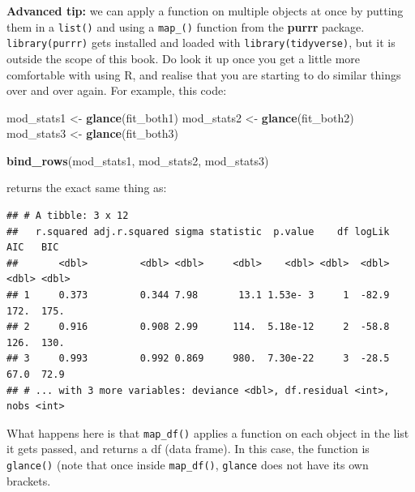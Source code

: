 \documentclass[
  12pt,
  krantz2]{krantz}
\makeatletter
\newenvironment{Shaded}{\begin{snugshade}}{\end{snugshade}}
\newcommand{\KeywordTok}[1]{\textcolor[rgb]{0.13,0.29,0.53}{\textbf{#1}}}
\newcommand{\NormalTok}[1]{#1}
\newcommand{\OperatorTok}[1]{\textcolor[rgb]{0.81,0.36,0.00}{\textbf{#1}}}
\newcommand{\StringTok}[1]{\textcolor[rgb]{0.31,0.60,0.02}{#1}}
\newenvironment{kframe}{%
\medskip{}
\setlength{\fboxsep}{.8em}
 \def\at@end@of@kframe{}%
 \ifinner\ifhmode%
  \def\at@end@of@kframe{\end{minipage}}%
  \begin{minipage}{\columnwidth}%
 \fi\fi%
 \def\FrameCommand##1{\hskip\@totalleftmargin \hskip-\fboxsep
 \colorbox{shadecolor}{##1}\hskip-\fboxsep
     \hskip-\linewidth \hskip-\@totalleftmargin \hskip\columnwidth}%
 \MakeFramed {\advance\hsize-\width
   \@totalleftmargin\z@ \linewidth\hsize
   \@setminipage}}%
 {\par\unskip\endMakeFramed%
 \at@end@of@kframe}
\renewenvironment{Shaded}{\begin{kframe}}{\end{kframe}}
\makeatother
\begin{document}
\textbf{Advanced tip:} we can apply a function on multiple objects at once by putting them in a \texttt{list()} and using a \texttt{map\_()} function from the \textbf{purrr} package. \texttt{library(purrr)} gets installed and loaded with \texttt{library(tidyverse)}, but it is outside the scope of this book. Do look it up once you get a little more comfortable with using R, and realise that you are starting to do similar things over and over again. For example, this code:

\begin{Shaded}
\begin{Highlighting}[]
\NormalTok{mod_stats1 <-}\StringTok{ }\KeywordTok{glance}\NormalTok{(fit_both1)}
\NormalTok{mod_stats2 <-}\StringTok{ }\KeywordTok{glance}\NormalTok{(fit_both2)}
\NormalTok{mod_stats3 <-}\StringTok{ }\KeywordTok{glance}\NormalTok{(fit_both3)}

\KeywordTok{bind_rows}\NormalTok{(mod_stats1, mod_stats2, mod_stats3)}
\end{Highlighting}
\end{Shaded}

returns the exact same thing as:

\begin{Shaded}
\end{Shaded}

\begin{verbatim}
## # A tibble: 3 x 12
##   r.squared adj.r.squared sigma statistic  p.value    df logLik   AIC   BIC
##       <dbl>         <dbl> <dbl>     <dbl>    <dbl> <dbl>  <dbl> <dbl> <dbl>
## 1     0.373         0.344 7.98       13.1 1.53e- 3     1  -82.9 172.  175. 
## 2     0.916         0.908 2.99      114.  5.18e-12     2  -58.8 126.  130. 
## 3     0.993         0.992 0.869     980.  7.30e-22     3  -28.5  67.0  72.9
## # ... with 3 more variables: deviance <dbl>, df.residual <int>, nobs <int>
\end{verbatim}

What happens here is that \texttt{map\_df()} applies a function on each object in the list it gets passed, and returns a df (data frame). In this case, the function is \texttt{glance()} (note that once inside \texttt{map\_df()}, \texttt{glance} does not have its own brackets.
\end{document}
